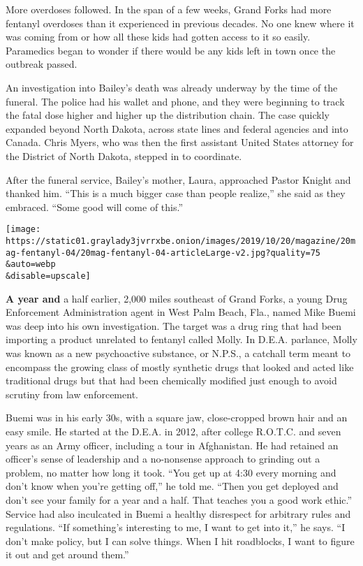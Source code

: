 More overdoses followed. In the span of a few weeks, Grand Forks had
more fentanyl overdoses than it experienced in previous decades. No one
knew where it was coming from or how all these kids had gotten access to
it so easily. Paramedics began to wonder if there would be any kids left
in town once the outbreak passed.

An investigation into Bailey's death was already underway by the time of
the funeral. The police had his wallet and phone, and they were
beginning to track the fatal dose higher and higher up the distribution
chain. The case quickly expanded beyond North Dakota, across state lines
and federal agencies and into Canada. Chris Myers, who was then the
first assistant United States attorney for the District of North Dakota,
stepped in to coordinate.

After the funeral service, Bailey's mother, Laura, approached Pastor
Knight and thanked him. ``This is a much bigger case than people
realize,'' she said as they embraced. ``Some good will come of this.''

\texttt{[image: https://static01.graylady3jvrrxbe.onion/images/2019/10/20/magazine/20mag-fentanyl-04/20mag-fentanyl-04-articleLarge-v2.jpg?quality=75\\\&auto=webp\\\&disable=upscale]}

\textbf{A year and} a half earlier, 2,000 miles southeast of Grand
Forks, a young Drug Enforcement Administration agent in West Palm Beach,
Fla., named Mike Buemi was deep into his own investigation. The target
was a drug ring that had been importing a product unrelated to fentanyl
called Molly. In D.E.A. parlance, Molly was known as a new psychoactive
substance, or N.P.S., a catchall term meant to encompass the growing
class of mostly synthetic drugs that looked and acted like traditional
drugs but that had been chemically modified just enough to avoid
scrutiny from law enforcement.

Buemi was in his early 30s, with a square jaw, close-cropped brown hair
and an easy smile. He started at the D.E.A. in 2012, after college
R.O.T.C. and seven years as an Army officer, including a tour in
Afghanistan. He had retained an officer's sense of leadership and a
no-nonsense approach to grinding out a problem, no matter how long it
took. ``You get up at 4:30 every morning and don't know when you're
getting off,'' he told me. ``Then you get deployed and don't see your
family for a year and a half. That teaches you a good work ethic.''
Service had also inculcated in Buemi a healthy disrespect for arbitrary
rules and regulations. ``If something's interesting to me, I want to get
into it,'' he says. ``I don't make policy, but I can solve things. When
I hit roadblocks, I want to figure it out and get around them.''

